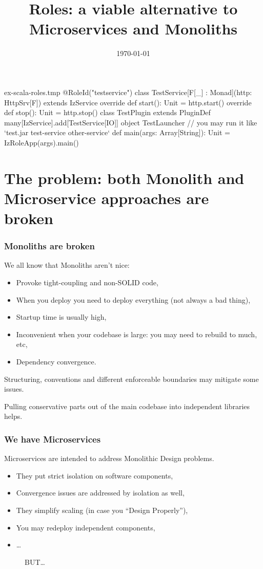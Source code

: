 \documentclass[usenames,dvipsnames]{beamer}
\title[Roles]{Roles: a viable alternative to Microservices and Monoliths}
\institute[Septimal Mind Ltd]
    {
    Septimal Mind Ltd\\
    \medskip
    \textit{team@7mind.io}
    }
\date{\today}
\begin{document}
\begin{VerbatimOut}{ex-scala-roles.tmp}
@RoleId("testservice") 
class TestService[F[_] : Monad](http: HttpSrv[F]) 
  extends IzService {
    override def start(): Unit = http.start()
    override def stop(): Unit = http.stop()
}
class TestPlugin extends PluginDef {
  many[IzService].add[TestService[IO]]
}
object TestLauncher {
  // you may run it like `test.jar test-service other-service`
  def main(args: Array[String]): Unit = IzRoleApp(args).main()
}
\end{VerbatimOut}

\begin{frame}
\titlepage
\end{frame}

\section{The problem: both Monolith and Microservice approaches are broken}

\begin{frame}
\frametitle{Monoliths are broken}
We all know that Monoliths aren't nice:
\begin{itemize}
\item Provoke tight-coupling and non-SOLID code,
\item When you deploy you need to deploy everything (not always a bad thing),
\item Startup time is usually high,
\item Inconvenient when your codebase is large: you may need to rebuild to much, etc,
\item Dependency convergence.
\end{itemize}

Structuring, conventions and different enforceable boundaries may mitigate some issues.

Pulling conservative parts out of the main codebase into independent libraries helps.
\end{frame}

\begin{frame}
\frametitle{We have Microservices}
Microservices are intended to address Monolithic Design problems.
\begin{itemize}
\item They put strict isolation on software components,
\item Convergence issues are addressed by isolation as well,
\item They simplify scaling (in case you ``Design Properly''),
\item You may redeploy independent components,
\item \dots
\end{itemize}
\begin{figure}
    \Large BUT\dots
\end{figure}
\end{frame}
\end{document}
